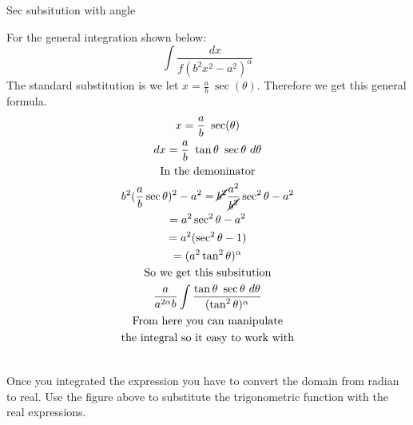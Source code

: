\documentclass[letterpaper,10pt,twoside,twocolumn,openany]{book}
\begin{document}
\newpage
\begin{DndSidebar}[]{Sec subsitution with angle}

    For the general integration shown below:
    \begin{equation}
        \int \frac{dx}{f(b^2x^2 - a^2)^\alpha}
    \end{equation}
    The standard substitution is we let $x = \frac{a}{b}\ \sec(\theta)$. Therefore we get this general formula.
    \begin{gather*}
        x = \frac{a}{b}\ \sec(\theta)\\
        dx =  \frac{a}{b}\ \tan\theta\ \sec\theta\ d\theta\\
        \text{In the demoninator}\\
        b^2(\frac{a}{b} \sec\theta)^2 - a^2 =\cancel{b^2} \frac{a^2}{\cancel{b^2}}\sec^2\theta - a^2\\ 
        = a^2 \sec^2\theta - a^2\\
        = a^2(\sec^2\theta - 1)\\
        = (a^2 \tan^2\theta)^\alpha\\
        \text{So we get this subsitution}\\
        \frac{a}{a^{2\alpha}b} \int \frac{\tan\theta\ \sec\theta\ d\theta}{(\tan^2\theta)^\alpha}\\
        \text{From here you can manipulate}\\
        \text{the integral so it easy to work with}
    \end{gather*}

    \centering
    \\
    Once you integrated the expression you have to convert the domain from radian to real. Use the figure above to substitute the trigonometric function with the real expressions.
\end{DndSidebar}


\newpage
\end{document}
